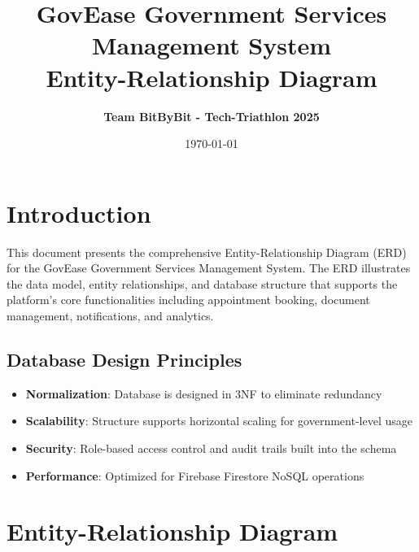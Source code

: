 \documentclass[12pt,a4paper]{article}
\title{\textbf{\color{primaryblue}GovEase Government Services Management System\\Entity-Relationship Diagram}}
\author{\textbf{Team BitByBit - Tech-Triathlon 2025}}
\date{\today}
\begin{document}
\maketitle

\tableofcontents
\newpage

\section{Introduction}

This document presents the comprehensive Entity-Relationship Diagram (ERD) for the GovEase Government Services Management System. The ERD illustrates the data model, entity relationships, and database structure that supports the platform's core functionalities including appointment booking, document management, notifications, and analytics.

\subsection{Database Design Principles}
\begin{itemize}[leftmargin=*]
    \item \textbf{Normalization}: Database is designed in 3NF to eliminate redundancy
    \item \textbf{Scalability}: Structure supports horizontal scaling for government-level usage
    \item \textbf{Security}: Role-based access control and audit trails built into the schema
    \item \textbf{Performance}: Optimized for Firebase Firestore NoSQL operations
\end{itemize}

\section{Entity-Relationship Diagram}
\end{document}
